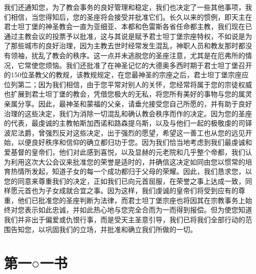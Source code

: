 我们还通知您，为了教会事务的良好管理和稳定，我们也决定了一些其他事项，我们相信，当您得知后，您的圣座将会接受并批准它们。长久以来的惯例，即天主在君士坦丁堡的神圣教会一直为亚细亚、本都和色雷斯各省任命都主教，我们现在已通过主教会议的投票予以批准，这与其说是赋予君士坦丁堡宗座特权，不如说是为了那些城市的良好治理，因为主教去世时经常发生混乱，神职人员和教友那时都没有领袖，扰乱了教会的秩序。这一点并未逃脱您的圣座注意，尤其是在厄弗所的情况，它常使您烦恼。我们还批准了在神圣记忆的大德奥多西时期于君士坦丁堡召开的150位圣教父的教规，该教规规定，在您最神圣的宗座之后，君士坦丁堡宗座应位列第二；因为我们相信，由于您平常对别人的关怀，您经常将属于您的宗徒权威也扩展到君士坦丁堡的教会，凭借您极大的无私，将您所有美好的事物与您的属灵亲属分享。因此，最神圣和蒙福的父亲，请垂允接受您自己所愿的，并有助于良好治理的这些决定，我们为消除一切混乱和确认教会秩序而作的决定。因为您的圣座的代表，最虔诚的主教帕斯加西诺和路森提乌斯，以及与他们一起的极敬虔的司铎波尼法爵，曾强烈反对这些决定，出于强烈的愿望，希望这一善工也从您的远见开始，以便良好秩序和信仰的确立都归功于您。因为我们恰当地考虑到我们最虔诚和爱基督的皇帝们，他们对此感到喜悦，以及显赫的元老院和几乎整个帝都，我们认为利用这次大公会议来批准您的荣誉是适时的，并确信这决定如同由您以惯常的培育热情所发起，知道子女的每一个成功都归于父母的荣耀。因此，我们恳求您，以您的同意来尊重我们的决定，正如我们已向元首屈服，在荣誉之事上达成一致，同样愿元首也为子女成就合宜之事。因为这样，我们虔诚的皇帝们将受到应有的尊重，他们已批准您的圣座判断为法律，而君士坦丁堡宗座也将因其在宗教事务上始终对您表示如此忠诚，并如此热心地与您完全合而为一而得到报偿。但为使您知道我们并非出于偏爱或仇恨行事，而是受天主圣意引导，我们已将我们全部行动的范围告知您，以巩固我们的立场，并批准和确立我们所做的一切。\par



\section{第一○一书}

\par

\par

